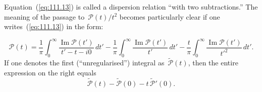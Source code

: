 Equation~(\ref{eq:111.13}) is called a dispersion relation ``with two subtractions.'' The meaning of the passage to~$\mathcal{P}(t)/t^2$ becomes particularly clear if one writes~(\ref{eq:111.13}) in the form:


\begin{equation}
\mathcal{P}(t) = \frac{1}{\pi}\int_0^\infty \frac{\operatorname{Im}\mathcal{P}(t')}{t' - t - i0}\,dt' - \frac{1}{\pi}\int_0^\infty \frac{\operatorname{Im}\mathcal{P}(t')}{t'}\,dt' - \frac{t}{\pi}\int_0^\infty \frac{\operatorname{Im}\mathcal{P}(t')}{t'^2}\,dt'.
\label{eq:111.14}
\end{equation}
If one denotes the first (``unregularised'') integral as~$\tilde{\mathcal{P}}(t)$, then the entire expression on the right equals
\[
\tilde{\mathcal{P}}(t) - \tilde{\mathcal{P}}(0) - t\,\tilde{\mathcal{P}}'(0).
\]
